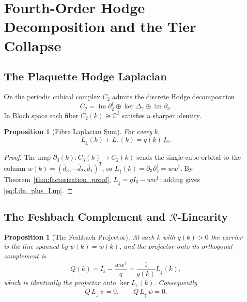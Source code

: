 \documentclass[11pt,a4paper]{article}
\newtheorem{proposition}[theorem]{Proposition}
\theoremstyle{definition}
\newcommand{\C}{\mathbb{C}}
\newcommand{\Ldn}{L_{\downarrow}}
\newcommand{\Lup}{L_{\uparrow}}
\newcommand{\dg}{^{\dagger}}
\newcommand{\Rc}{\mathcal{R}}          %
\begin{document}
\section{Fourth-Order Hodge Decomposition and the Tier Collapse}\label{sec:hodge}

\subsection{The Plaquette Hodge Laplacian}

On the periodic cubical complex $C_2$ admits the discrete Hodge decomposition
\begin{equation}\label{eq:hodge_c2}
  C_2 = \operatorname{im}\partial_2\dg \oplus \ker\Delta_2 \oplus \operatorname{im}\partial_3 .
\end{equation}
In Bloch space each fiber $C_2(k)\cong\C^3$ satisfies a sharper identity.

\begin{proposition}[Fibre Laplacian Sum]\label{prop:fiber_laplacian_sum}
For every $k$,
\begin{equation}\label{eq:Ldn_plus_Lup}
  \Ldn(k) + \Lup(k) = q(k)\,I_3 .
\end{equation}
\end{proposition}

\begin{proof}
The map $\partial_3(k) : C_3(k)\to C_2(k)$ sends the single cube orbital to the column $w(k) = (\bar d_3,-\bar d_2,\bar d_1)^T$, so $\Lup(k) = \partial_3\partial_3\dg = w w\dg$. By Theorem~\ref{thm:factorization_proof}, $\Ldn = qI_3 - ww\dg$; adding gives \eqref{eq:Ldn_plus_Lup}.
\end{proof}

\subsection{The Feshbach Complement and \texorpdfstring{$\Rc$}{R}-Linearity}

\begin{proposition}[The Feshbach Projector]\label{prop:feshbach_proj}
At each $k$ with $q(k)>0$ the carrier is the line spanned by $\psi(k) = w(k)$, and the projector onto its orthogonal complement is
\begin{equation}\label{eq:feshbach_Q}
  Q(k) = I_3 - \frac{w w\dg}{q} = \frac{1}{q(k)}\Ldn(k),
\end{equation}
which is identically the projector onto $\ker\Lup(k)$. Consequently
\begin{equation}\label{eq:Q_annihilates_Hodge}
  Q\,\Ldn\,\psi = 0, \qquad Q\,\Lup\,\psi = 0 .
\end{equation}
\end{proposition}
\end{document}
